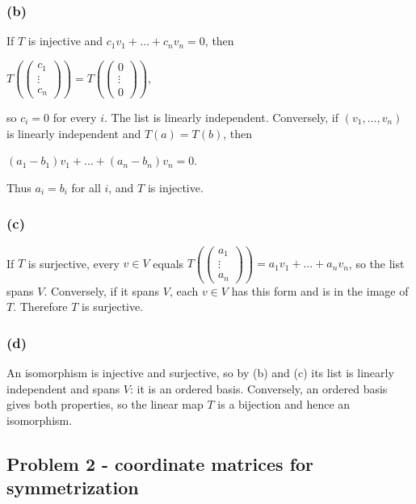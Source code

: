 \subsubsection{(b)}

If \(T\) is injective and \(c_{1}v_{1} + \ldots + c_{n}v_{n} = 0\), then

\(T\left( \begin{pmatrix}
c_{1} \\
\vdots \\
c_{n}
\end{pmatrix} \right) = T\left( \begin{pmatrix}
0 \\
\vdots \\
0
\end{pmatrix} \right),\)

so \(c_{i} = 0\) for every \(i\). The list is linearly independent. Conversely, if \(\left( {v_{1},\ldots,v_{n}} \right)\) is linearly independent and \(T(a) = T(b)\), then

\(\left( {a_{1} - b_{1}} \right)v_{1} + \ldots + \left( {a_{n} - b_{n}} \right)v_{n} = 0.\)

Thus \(a_{i} = b_{i}\) for all \(i\), and \(T\) is injective.

\subsubsection{(c)}

If \(T\) is surjective, every \(v \in V\) equals \(T\left( \begin{pmatrix}
a_{1} \\
\vdots \\
a_{n}
\end{pmatrix} \right) = a_{1}v_{1} + \ldots + a_{n}v_{n}\), so the list spans \(V\). Conversely, if it spans \(V\), each \(v \in V\) has this form and is in the image of \(T\). Therefore \(T\) is surjective.

\subsubsection{(d)}

An isomorphism is injective and surjective, so by (b) and (c) its list is linearly independent and spans \(V\): it is an ordered basis. Conversely, an ordered basis gives both properties, so the linear map \(T\) is a bijection and hence an isomorphism.

\subsection{Problem 2 - coordinate matrices for symmetrization}

